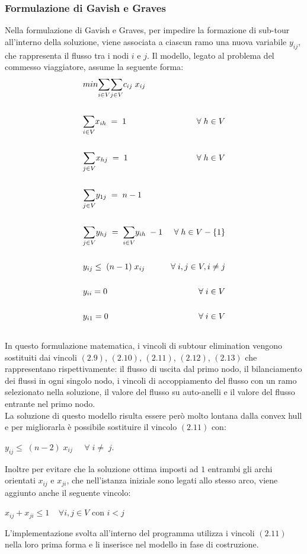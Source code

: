 \subsubsection{Formulazione di Gavish e Graves}
Nella formulazione di Gavish e Graves, per impedire la formazione di sub-tour all'interno della soluzione, viene associata a ciascun ramo una nuova variabile $y_{ij}$, che rappresenta il flusso tra i nodi $i$ e $j$. Il modello, legato al problema del commesso viaggiatore, assume la seguente forma\cite{COMPACT_CITE}:
\begin{align}
& min\underset{i\in V}\sum{\underset{j\in V}\sum{c_{ij}\; x_{ij}}} \\ \notag \\
& \underset{i\in V}\sum{x_{ih}}\;=\;1 & \forall\;h\in V \\ \notag\\
& \underset{j\in V}\sum{x_{hj}}\;=\;1 & \forall\;h\in V \\ \notag\\
& \underset{j\in V}\sum{y_{1j}}\;=\;n-1\\ \notag\\
& \underset{j\in V}\sum{y_{hj}}\;=\;\underset{i\in V}\sum{y_{ih}}\;-1 & \forall\;h\in V-\{1\}\\ \notag\\
& y_{ij}\leq\;(n-1)\;x_{ij} & \forall\;i,j\in V, i\neq j\\ \notag\\
& y_{ii}=0 & \forall\;i\in V\\\notag\\
& y_{i1}=0 & \forall\;i\in V\\\notag
\end{align}
In questo formulazione matematica, i vincoli di subtour elimination vengono sostituiti dai vincoli $(2.9)$, $(2.10)$, $(2.11)$, $(2.12)$, $(2.13)$ che rappresentano rispettivamente: il flusso di uscita dal primo nodo, il bilanciamento dei flussi in ogni singolo nodo, i vincoli di accoppiamento del flusso con un ramo selezionato nella soluzione, il valore del flusso su auto-anelli e il valore del flusso entrante nel primo nodo.\\
La soluzione di questo modello risulta essere però molto lontana dalla convex hull e per migliorarla è possibile sostituire il vincolo $(2.11)$ con: \\
\begin{center}
$y_{ij}\leq\;(n-2)\;x_{ij} \;\;\;\;\;\forall\; i\neq \; j$.\\
\end{center} 
Inoltre per evitare che la soluzione ottima imposti ad $1$ entrambi gli archi orientati $x_{ij}$ e $x_{ji}$, che nell'istanza iniziale sono legati allo stesso arco, viene aggiunto anche il seguente vincolo:
\begin{center}
$x_{ij}+x_{ji}\leq 1\;\;\;\; \forall i,j \in V$ con $i < j$
\end{center}
L'implementazione svolta all'interno del programma utilizza i vincoli $(2.11)$ nella loro prima forma e li inserisce nel modello in fase di costruzione.

